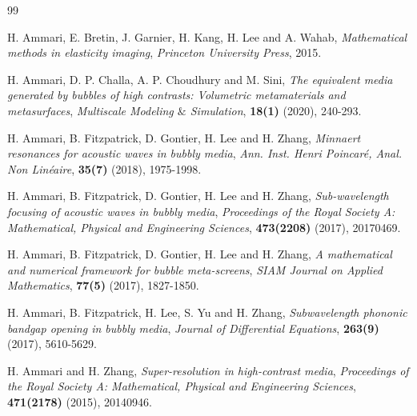 \documentclass[11pt,reqno,twoside]{amsart}
\theoremstyle{definition}
\theoremstyle{remark}
\numberwithin{equation}{section}
\begin{document}
\begin{thebibliography}{99}
	
	H. Ammari, E. Bretin, J. Garnier, H. Kang, H. Lee and A. Wahab, {\it Mathematical methods in elasticity imaging}, {\em Princeton University Press}, 2015.
	
	H. Ammari, D. P. Challa, A. P. Choudhury and M. Sini, {\it The equivalent media generated by bubbles of high contrasts: Volumetric metamaterials and metasurfaces}, {\em Multiscale Modeling $\&$ Simulation}, {\bf 18(1)} (2020), 240-293.
	
	
	
	
	
	
	H. Ammari, B. Fitzpatrick, D. Gontier, H. Lee and H. Zhang,  {\it Minnaert resonances for acoustic waves in bubbly media}, {\em Ann. Inst. Henri Poincar\'e, Anal. Non Lin\'eaire}, {\bf 35(7)} (2018), 1975-1998. 	
	
	H. Ammari, B. Fitzpatrick, D. Gontier, H. Lee and H. Zhang,  {\it Sub-wavelength focusing of acoustic waves in bubbly media}, {\em Proceedings of the Royal Society A: Mathematical, Physical and Engineering Sciences}, {\bf 473(2208)} (2017), 20170469.
	
	H. Ammari, B. Fitzpatrick, D. Gontier, H. Lee and H. Zhang,  {\it A mathematical and numerical framework for bubble meta-screens}, {\em SIAM Journal on Applied Mathematics}, {\bf 77(5)} (2017), 1827-1850.
	
	H. Ammari, B. Fitzpatrick, H. Lee, S. Yu and H. Zhang, {\it Subwavelength phononic bandgap opening in bubbly media}, {\em Journal of Differential Equations}, {\bf 263(9)} (2017), 5610-5629.
	
	H. Ammari and H. Zhang, {\it Super-resolution in high-contrast media}, {\em Proceedings of the Royal Society A: Mathematical, Physical and Engineering Sciences}, {\bf 471(2178)} (2015), 20140946.
	

\end{thebibliography}
\end{document}
